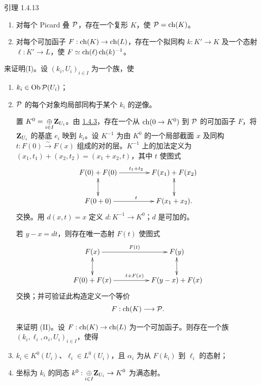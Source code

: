 \begin{enonce*}{引理 1.4.13} \begin{enumerate} \renewcommand{\theenumi}{\Roman{enumi}} \renewcommand{\labelenumi}{(\theenumi)} \item 对每个 Picard 叠 ${\mathcal P}$，存在一个复形 $K$，使 ${\mathcal P}=\operatorname{ch}(K)$。

\item 对每个可加函子 $F:\operatorname{ch}(K)\rightarrow \operatorname{ch}(L)$，存在一个拟同构 $k:K'\rightarrow K$ 及一个态射 $\ell:K'\rightarrow L$，使 $F\simeq \operatorname{ch}(\ell)\operatorname{ch}(k)^{-1}$。 \end{enumerate} \end{enonce*}

来证明\pageoriginale (I)。设 $(k_{i},U_{i})_{i\in I}$ 为一个族，使 \begin{enumerate} \renewcommand{\theenumi}{\alph{enumi}} \renewcommand{\labelenumi}{(\theenumi)} \item $k_{i}\in \operatorname{Ob} {\mathcal P}(U_{i})$；

\item ${\mathcal P}$ 的每个对象均局部同构于某个 $k_{i}$ 的逆像。

置 $K^{0}=\displaystyle{\mathop{\oplus}_{i\in
I}}\mathbf{Z}_{U_{i}}$。由 \hyperref[XVIII.lem1.4.3]{1.4.3}，存在一个从 $\operatorname{ch}(0\rightarrow K^{0})$ 到 ${\mathcal P}$ 的可加函子 $F$，将 $\mathbf{Z}_{U_{i}}$ 的基底 $e_{i}$ 映到 $k_{i}$。设 $K^{-1}$ 为由 $K^{0}$ 的一个局部截面 $x$ 及同构 $t:F(0)\xrightarrow{\sim} F(x)$ 组成的对的层。$K^{-1}$ 上的加法定义为 $(x_{1},
t_{1})+(x_{2},t_{2})=(x_{1}+x_{2},t)$，其中 $t$ 使图式 $$
\xymatrix@C=1.5cm{
F(0) + F(0)    \ar[r]^{t_1+t_2} \ar@{<->}[d]   & F(x_1) + F(x_2)\ar@{<->}[d]\\
F(0+0)          \ar[r]^{t}         & F(x_1+x_2).
}
$$ 交换。用 $d(x,t)=x$ 定义 $d:K^{-1}\rightarrow K^{0}$；$d$ 是可加的。

若 $y-x=dt$，则存在唯一态射 $F(t)$ 使图式 $$
\xymatrix@C=1.75cm{
F(x)           \ar[r]^{F(t)}   \ar@{<->}[d]& F(y) \ar@{<->}[d]\\
F(0)+F(x)      \ar[r]^{t+F(x)} & F(y-x)+F(x)
}
$$ 交换；并可验证此构造定义一个等价 $$
F:\operatorname{ch}(K)\longrightarrow {\mathcal P}{}.
$$

来证明 (II)。设 $F:\operatorname{ch}(K)\rightarrow \operatorname{ch}(L)$ 为一个可加函子。则存在一个族 $(k_{i},\ell_{i}, \alpha_{i},
U_{i})_{i\in I}$，使得

\item $k_{i}\in K^{0}(U_{i})$、$\ell_{i}\in L^{0}(U_{i})$，且 $\alpha_{i}$ 为从 $F(k_{i})$ 到 $\ell_{i}$ 的态射；

\item 坐标为 $k_{i}$ 的同态 $k^{0}:\displaystyle{\mathop{\oplus}_{i\in
I}}\mathbf{Z}_{U_{i}}\rightarrow K^{0}$ 为满态射。


\end{enumerate}
